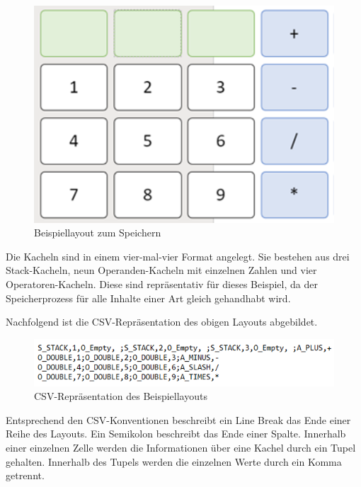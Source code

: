 \begin{figure}[h]
	\includegraphics[scale=1]{img/beispiellayout-zum-speichern}
	\caption[Beispiellayout zum Speichern]{Beispiellayout zum Speichern\footnotemark}
\end{figure}
\FloatBarrier

Die Kacheln sind in einem vier-mal-vier Format angelegt. Sie bestehen aus drei Stack-Kacheln, neun Operanden-Kacheln mit einzelnen Zahlen und vier Operatoren-Kacheln. Diese sind repräsentativ für dieses Beispiel, da der Speicherprozess für alle Inhalte einer Art gleich gehandhabt wird.

Nachfolgend ist die CSV-Repräsentation des obigen Layouts abgebildet. 

\begin{figure}[h]
	\includegraphics[scale=1]{img/csv-repraesentation-layout}
	\caption[CSV-Repräsentation des Beispiellayouts]{CSV-Repräsentation des Beispiellayouts\footnotemark}
\end{figure}
\FloatBarrier

Entsprechend den CSV-Konventionen beschreibt ein Line Break \code{\\n} das Ende einer Reihe des Layouts. Ein Semikolon \code{;} beschreibt das Ende einer Spalte. Innerhalb einer einzelnen Zelle werden die Informationen über eine Kachel durch ein Tupel gehalten. Innerhalb des Tupels werden die einzelnen Werte durch ein Komma \code{,} getrennt.

